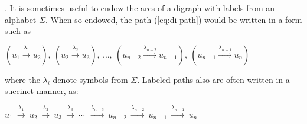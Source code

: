 \bigskip


.
It is sometimes useful to endow the arcs of a digraph with labels from an alphabet $\Sigma$.  When so endowed, the path (\ref{eq:di-path}) would be written in a form such as

\smallskip

\hspace*{.35in}$\displaystyle
(u_1 \stackrel{\lambda_1}{\rightarrow} u_2), \ 
(u_2 \stackrel{\lambda_2}{\rightarrow} u_3), \ \ldots, \ 
(u_{n-2} \stackrel{\lambda_{n-2}}{\rightarrow} u_{n-1}), \ 
(u_{n-1} \stackrel{\lambda_{n-1}}{\rightarrow} u_n)$

\smallskip

\noindent
where the $\lambda_i$ denote symbols from $\Sigma$.  Labeled paths also are often written in a succinct manner, as:

\smallskip

\hspace*{.35in}$\displaystyle 
u_1 \ \stackrel{\lambda_1}{\rightarrow} \ u_2
    \ \stackrel{\lambda_2}{\rightarrow} \ u_3
    \ \stackrel{\lambda_3}{\rightarrow} \ \cdots \ 
    \ \stackrel{\lambda_{n-3}}{\rightarrow} \ u_{n-2}
    \ \stackrel{\lambda_{n-2}}{\rightarrow} \ u_{n-1}
    \  \stackrel{\lambda_{n-1}}{\rightarrow} \ u_n$

\bigskip


